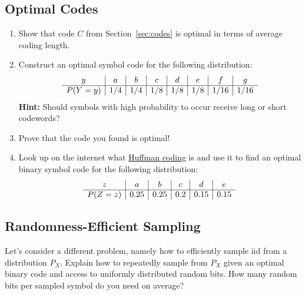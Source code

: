 \documentclass[11p,a4paper]{article}
\begin{document}
\subsection{Optimal Codes}
\begin{enumerate}
\item Show that code $C$ from Section~\ref{sec:codes} is optimal in
  terms of average coding length.
\item Construct an optimal symbol code for the following
  distribution:
\[
\begin{array}{c | c | c | c | c | c | c | c}
y & a & b & c & d & e & f & g\\
\hline
P(Y=y) & 1/4 & 1/4   & 1/8   & 1/8 & 1/8 & 1/16 & 1/16 \\
\end{array}
\]
{\bf Hint:} Should symbols with high probability to occur receive long or short codewords?
\item Prove that the code you found is optimal!
\item Look up on the internet what
  \href{https://en.wikipedia.org/wiki/Huffman_coding}{Huffman coding}
  is and use it to find an optimal binary symbol code for the following distribution:
\[
\begin{array}{c | c | c | c | c | c}
z & a & b & c & d & e\\
\hline
P(Z=z) & 0.25 & 0.25   & 0.2   & 0.15 & 0.15 \\
\end{array}
\]
\end{enumerate}

\subsection{Randomness-Efficient Sampling}
Let's consider a different problem, namely how to efficiently sample iid from a
distribution $P_X$. Explain how to repeatedly sample from $P_X$ given an optimal binary code
and access to uniformly distributed random bits. How many random bits
per sampled symbol do you need on average?
\end{document}
